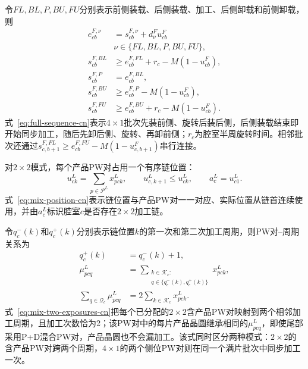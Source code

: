 \documentclass[journal]{IEEEtran}
\begin{document}
令$FL,BL,P,BU,FU$分别表示前侧装载、后侧装载、加工、后侧卸载和前侧卸载，则
\begin{equation}
\begin{aligned}
e^{F,\nu}_{cb}&=s^{F,\nu}_{cb}+d^{F}_{\nu}u^F_{cb}
\\[-1pt]&\nu\in\{FL,BL,P,BU,FU\},\\
s^{F,BL}_{cb}&\ge e^{F,FL}_{cb}+r_c-M(1-u^F_{cb}),\\
s^{F,P}_{cb}&=e^{F,BL}_{cb},\\
s^{F,BU}_{cb}&\ge e^{F,P}_{cb}-M(1-u^F_{cb}),\\
s^{F,FU}_{cb}&\ge e^{F,BU}_{cb}+r_c-M(1-u^F_{cb}).
\end{aligned}
\label{eq:full-sequence-cn}
\end{equation}
式~\eqref{eq:full-sequence-cn}表示$4\times1$批次先装前侧、旋转后装后侧，后侧装载结束即开始同步加工，随后先卸后侧、旋转、再卸前侧；$r_c$为腔室半周旋转时间。相邻批次还通过$s^{F,FL}_{c,b+1}\ge e^{F,FU}_{cb}-M(1-u^F_{c,b+1})$串行连接。

对$2\times2$模式，每个产品PW对占用一个有序链位置：
\begin{equation}
u^L_{ck}=\sum_{p\in\mathcal P^L}x^L_{pck},\qquad
u^L_{c,k+1}\le u^L_{ck},\qquad
a^L_c=u^L_{c1}.
\label{eq:mix-position-cn}
\end{equation}
式~\eqref{eq:mix-position-cn}表示链位置与产品PW对一一对应、实际位置从链首连续使用，并由$a^L_c$标识腔室$c$是否存在$2\times2$加工链。

令$q_c^-(k)$和$q_c^+(k)$分别表示链位置$k$的第一次和第二次加工周期，则PW对--周期关系为
\begin{equation}
\begin{aligned}
q_c^+(k)&=q_c^-(k)+1,\\
\mu^L_{pcq}
&=\sum_{\substack{k\in\mathcal K_c:\\q\in\{q_c^-(k),q_c^+(k)\}}}x^L_{pck},\\
\sum_{q\in\mathcal Q_c}\mu^L_{pcq}
&=2\sum_{k\in\mathcal K_c}x^L_{pck}.
\end{aligned}
\label{eq:mix-two-exposures-cn}
\end{equation}
式~\eqref{eq:mix-two-exposures-cn}把每个已分配的$2\times2$含产品PW对映射到两个相邻加工周期，且加工次数恰为2；该PW对中的每片产品晶圆继承相同的$\mu^L_{pcq}$，即使尾部采用P+D混合PW对，产品晶圆也不会漏加工。该式同时区分两种模式：$2\times2$的含产品PW对跨两个周期，$4\times1$的两个侧位PW对则在同一个满片批次中同步加工一次。
\end{document}
